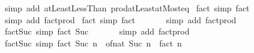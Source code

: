 \begin{isabellebody}
\ {\isacharparenleft}{\kern0pt}simp\ add{\isacharcolon}{\kern0pt}\ atLeast{}LessThan\ prod{\isachardot}{\kern0pt}atLeast{}{\isacharunderscore}{\kern0pt}atMost{\isacharunderscore}{\kern0pt}eq{\isacharparenright}{\kern0pt}\isanewline
{}\isamarkupfalse%
%
\endisatagproof
{\isafoldproof}%
%
\isadelimproof
\isanewline
%
\endisadelimproof
\isanewline
{}\isamarkupfalse%
\ fact{\isacharunderscore}{\kern0pt}{}\ {\isacharbrackleft}{\kern0pt}simp{\isacharbrackright}{\kern0pt}{\isacharcolon}{\kern0pt}\ {\isachardoublequoteopen}fact\ {}\ {\isacharequal}{\kern0pt}\ {}{\isachardoublequoteclose}\isanewline
%
\isadelimproof
\ \ %
\endisadelimproof
%
\isatagproof
{}\isamarkupfalse%
\ {\isacharparenleft}{\kern0pt}simp\ add{\isacharcolon}{\kern0pt}\ fact{\isacharunderscore}{\kern0pt}prod{\isacharparenright}{\kern0pt}%
\endisatagproof
{\isafoldproof}%
%
\isadelimproof
\isanewline
%
\endisadelimproof
\isanewline
{}\isamarkupfalse%
\ fact{\isacharunderscore}{\kern0pt}{}\ {\isacharbrackleft}{\kern0pt}simp{\isacharbrackright}{\kern0pt}{\isacharcolon}{\kern0pt}\ {\isachardoublequoteopen}fact\ {}\ {\isacharequal}{\kern0pt}\ {}{\isachardoublequoteclose}\isanewline
%
\isadelimproof
\ \ %
\endisadelimproof
%
\isatagproof
{}\isamarkupfalse%
\ {\isacharparenleft}{\kern0pt}simp\ add{\isacharcolon}{\kern0pt}\ fact{\isacharunderscore}{\kern0pt}prod{\isacharparenright}{\kern0pt}%
\endisatagproof
{\isafoldproof}%
%
\isadelimproof
\isanewline
%
\endisadelimproof
\isanewline
{}\isamarkupfalse%
\ fact{\isacharunderscore}{\kern0pt}Suc{\isacharunderscore}{\kern0pt}{}\ {\isacharbrackleft}{\kern0pt}simp{\isacharbrackright}{\kern0pt}{\isacharcolon}{\kern0pt}\ {\isachardoublequoteopen}fact\ {\isacharparenleft}{\kern0pt}Suc\ {}{\isacharparenright}{\kern0pt}\ {\isacharequal}{\kern0pt}\ {}{\isachardoublequoteclose}\isanewline
%
\isadelimproof
\ \ %
\endisadelimproof
%
\isatagproof
{}\isamarkupfalse%
\ {\isacharparenleft}{\kern0pt}simp\ add{\isacharcolon}{\kern0pt}\ fact{\isacharunderscore}{\kern0pt}prod{\isacharparenright}{\kern0pt}%
\endisatagproof
{\isafoldproof}%
%
\isadelimproof
\isanewline
%
\endisadelimproof
\isanewline
{}\isamarkupfalse%
\ fact{\isacharunderscore}{\kern0pt}Suc\ {\isacharbrackleft}{\kern0pt}simp{\isacharbrackright}{\kern0pt}{\isacharcolon}{\kern0pt}\ {\isachardoublequoteopen}fact\ {\isacharparenleft}{\kern0pt}Suc\ n{\isacharparenright}{\kern0pt}\ {\isacharequal}{\kern0pt}\ of{\isacharunderscore}{\kern0pt}nat\ {\isacharparenleft}{\kern0pt}Suc\ n{\isacharparenright}{\kern0pt}\ {\isacharasterisk}{\kern0pt}\ fact\ n{\isachardoublequoteclose}\isanewline

\end{isabellebody}
